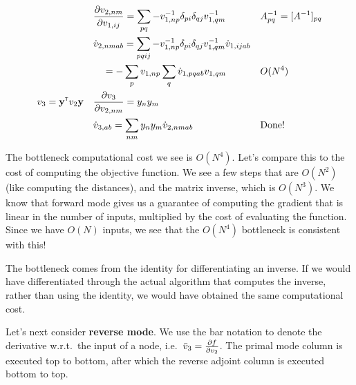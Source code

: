 \begin{align}
& && \pderiv[v_{2,nm}]{v_{1,ij}} = \sum_{pq}-v_{1,np}\inv \delta_{pi}\delta_{qj} v_{1,qm}\inv && A_{pq}\inv = [A\inv]_{pq} \\
& && \dot v_{2,nmab} = \sum_{pqij} -v_{1,np}\inv \delta_{pi}\delta_{qj} v_{1,qm}\inv \dot v_{1,ijab} && \\
& && \quad = -\sum_{p} v_{1,np} \sum_q \dot v_{1,pqab} v_{1,qm} && O(N^4) \\
v_3 &= \vy\transpose v_2 \vy && \pderiv[v_3]{v_{2,nm}} = y_ny_m  && \\
& &&\dot v_{3,ab} = \sum_{nm} y_ny_m \dot v_{2,nmab} && \text{Done!}
\end{align}

The bottleneck computational cost we see is $O(N^4)$. Let's compare this to the cost of computing the objective function. We see a few steps that are $O(N^2)$ (like computing the distances), and the matrix inverse, which is $O(N^3)$. We know that forward mode gives us a guarantee of computing the gradient that is linear in the number of inputs, multiplied by the cost of evaluating the function. Since we have $O(N)$ inputs, we see that the $O(N^4)$ bottleneck is consistent with this!

The bottleneck comes from the identity for differentiating an inverse. If we would have differentiated through the actual algorithm that computes the inverse, rather than using the identity, we would have obtained the same computational cost.

Let's next consider \textbf{reverse mode}. We use the bar notation to denote the derivative w.r.t.~the input of a node, i.e.~$\bar v_3 = \pderiv[f]{v_2}$. The primal mode column is executed top to bottom, after which the reverse adjoint column is executed bottom to top.

